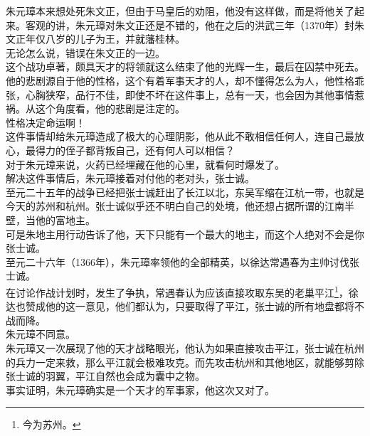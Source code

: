 \begin{multicols}{\theparacolNo}
朱元璋本来想处死朱文正，但由于马皇后的劝阻，他没有这样做，而是将他关了起来。客观的讲，朱元璋对朱文正还是不错的，他在之后的洪武三年（1370年）封朱文正年仅八岁的儿子为王，并就藩桂林。\\

无论怎么说，错误在朱文正的一边。\\

这个战功卓著，颇具天才的将领就这么结束了他的光辉一生，最后在囚禁中死去。他的悲剧源自于他的性格，这个有着军事天才的人，却不懂得怎么为人，他性格乖张，心胸狭窄，品行不佳，即使不坏在这件事上，总有一天，也会因为其他事情惹祸。从这个角度看，他的悲剧是注定的。\\

性格决定命运啊！\\

这件事情却给朱元璋造成了极大的心理阴影，他从此不敢相信任何人，连自己最放心，最得力的侄子都背叛自己，还有何人可以相信？\\

对于朱元璋来说，火药已经埋藏在他的心里，就看何时爆发了。\\

解决这件事情后，朱元璋接着对付他的老对头，张士诚。\\

至元二十五年的战争已经把张士诚赶出了长江以北，东吴军缩在江杭一带，也就是今天的苏州和杭州。张士诚似乎还不明白自己的处境，他还想占据所谓的江南半壁，当他的富地主。\\

可是朱地主用行动告诉了他，天下只能有一个最大的地主，而这个人绝对不会是你张士诚。\\

至元二十六年（1366年），朱元璋率领他的全部精英，以徐达常遇春为主帅讨伐张士诚。\\

在讨论作战计划时，发生了争执，常遇春认为应该直接攻取东吴的老巢平江\footnote{今为苏州。}，徐达也赞成他的这一意见，他们都认为，只要取得了平江，张士诚的所有地盘都将不战而降。\\

朱元璋不同意。\\

朱元璋又一次展现了他的天才战略眼光，他认为如果直接攻击平江，张士诚在杭州的兵力一定来救，那么平江就会极难攻克。而先攻击杭州和其他地区，就能够剪除张士诚的羽翼，平江自然也会成为囊中之物。\\

事实证明，朱元璋确实是一个天才的军事家，他这次又对了。\\


\end{multicols}
